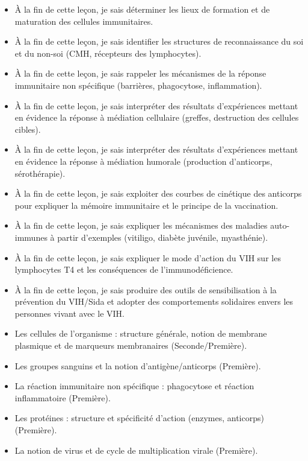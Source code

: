 \documentclass[11pt]{article}
\begin{document}
\begin{objectifs}
\begin{itemize}
\item À la fin de cette leçon, je sais déterminer les lieux de formation et de maturation des cellules immunitaires.
\item À la fin de cette leçon, je sais identifier les structures de reconnaissance du soi et du non-soi (CMH, récepteurs des lymphocytes).
\item À la fin de cette leçon, je sais rappeler les mécanismes de la réponse immunitaire non spécifique (barrières, phagocytose, inflammation).
\item À la fin de cette leçon, je sais interpréter des résultats d'expériences mettant en évidence la réponse à médiation cellulaire (greffes, destruction des cellules cibles).
\item À la fin de cette leçon, je sais interpréter des résultats d'expériences mettant en évidence la réponse à médiation humorale (production d'anticorps, sérothérapie).
\item À la fin de cette leçon, je sais exploiter des courbes de cinétique des anticorps pour expliquer la mémoire immunitaire et le principe de la vaccination.
\item À la fin de cette leçon, je sais expliquer les mécanismes des maladies auto-immunes à partir d'exemples (vitiligo, diabète juvénile, myasthénie).
\item À la fin de cette leçon, je sais expliquer le mode d'action du VIH sur les lymphocytes T4 et les conséquences de l'immunodéficience.
\item À la fin de cette leçon, je sais produire des outils de sensibilisation à la prévention du VIH/Sida et adopter des comportements solidaires envers les personnes vivant avec le VIH.
\end{itemize}
\end{objectifs}

\begin{prerequis}
\begin{itemize}
\item Les cellules de l'organisme : structure générale, notion de membrane plasmique et de marqueurs membranaires (Seconde/Première).
\item Les groupes sanguins et la notion d'antigène/anticorps (Première).
\item La réaction immunitaire non spécifique : phagocytose et réaction inflammatoire (Première).
\item Les protéines : structure et spécificité d'action (enzymes, anticorps) (Première).
\item La notion de virus et de cycle de multiplication virale (Première).
\end{itemize}
\end{prerequis}
\end{document}
